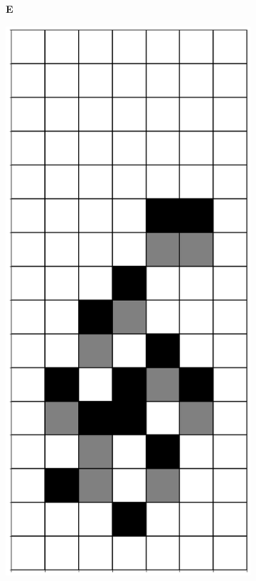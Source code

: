 \documentclass[12pt]{article}
\numberwithin{figure}{section} %
\begin{document}
\begin{figure}[H]
     	\begin{subfigure}[t]{0.03\textwidth}
    		\textbf{E}
  	\end{subfigure}	   
    	\begin{subfigure}{0.18\textwidth}
     		\centering
     		\includegraphics[width=\linewidth]{Section4/19.0}

\end{subfigure}
\end{figure}
\end{document}
